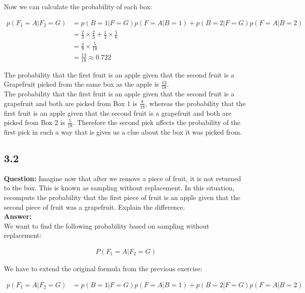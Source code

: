 \documentclass[a4paper]{article}
\begin{document}
Now we can calculate the probability of each box:

\begin{align*}
	p(F_1 = A | F_2 = G) &= p(B = 1| F = G)p(F = A | B = 1) + p(B = 2 | F = G)p(F = A | B = 2)\\
	&= \frac{2}{3} \times \frac{2}{3} +  \frac{1}{3} \times \frac{5}{6}	\\
	&= \frac{4}{9} \times \frac{5}{18}\\
	&= \frac{13}{18} \approx 0.722
\end{align*}

The probability that the first fruit is an apple given that the second fruit is a Grapefruit picked from the same box as the apple is $\frac{13}{18}$.\\
The probability that the first fruit is an apple given that the second fruit is a grapefruit and both are picked from Box 1 is $\frac{8}{18}$, whereas the probability that the first fruit is an apple given that the second fruit is a grapefruit and both are picked from Box 2 is $\frac{5}{18}$. Therefore the second pick affects the probability of the first pick in such a way that is gives us a clue about the box it was picked from.

\subsection*{3.2}


\textbf{Question:} Imagine now that after we remove a piece of fruit, it is not returned to the box. This is known as sampling without replacement. In this situation, recompute the probability that the first piece of fruit is an apple given that the second piece of fruit was a grapefruit. Explain the difference.\\

\textbf{Answer:}\\

We want to find the following probability based on sampling without replacement:

\begin{align*}
	P(F_1 = A | F_2 = G)
\end{align*}

We have to extend the original formula from the previous exercise:

\begin{align*}
	p(F_1 = A | F_2 = G) &= p(B = 1| F = G)p(F = A | B = 1) + p(B = 2 | F = G)p(F = A | B = 2)\\
\end{align*}
\end{document}
